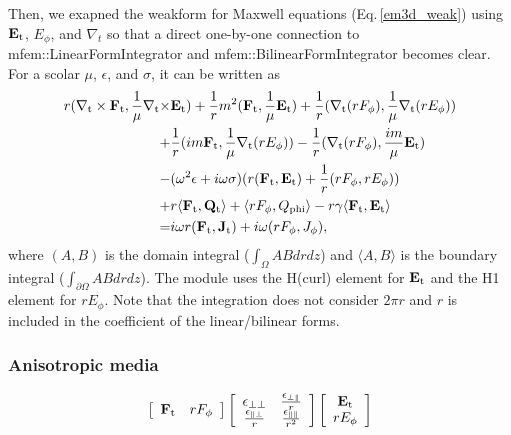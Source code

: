 \documentclass[11pt,a4paper,final]{report}
\begin{document}
Then, we exapned the weakform for Maxwell equations (Eq.\,\ref{em3d_weak}) using $\mathbf{E}_{\rm t}$, $E_{\phi}$, and $\nabla_{t}$ so that a direct one-by-one connection to mfem::LinearFormIntegrator and mfem::BilinearFormIntegrator becomes clear.
For a scolar $\mu$, $\epsilon$, and $\sigma$, it can be written as 
 \begin{align}
r(\nabla_{\rm t} \times \mathbf{F}_{\rm t},  \frac{1}{\mu}\nabla_{\rm t}  \times & \mathbf{E}_{\rm t}) 
+\frac{1}{r} m^2(\mathbf{F}_{\rm t}, \frac{1}{\mu}\mathbf{E}_{\rm t})
+ \frac{1}{r} (\nabla_{\rm t} (rF_{\rm \phi}), \frac{1}{\mu}\nabla_{\rm t} (rE_{\rm \phi}))
 \notag \\
+& \frac{1}{r} (im \mathbf{F}_{\rm t}, \frac{1}{\mu}\nabla_{\rm t} (rE_{\rm \phi}))
- \frac{1}{r} (\nabla_{\rm t} (rF_{\rm \phi}), \frac{im}{\mu} \mathbf{E}_{\rm t})
 \notag \\
 -& (\omega^2 \epsilon+ i \omega \sigma) ( r( \mathbf{F}_{\rm t}, \mathbf{E}_{\rm t}) + \frac{1}{r}(rF_{\rm \phi}, rE_{\rm \phi})) 
 \notag \\
 +& r \langle \mathbf{F}_{\rm t},  \mathbf{Q}_{\rm t} \rangle + \langle rF_{\rm \phi}, Q_{\rm phi} \rangle -r \gamma \langle \mathbf{F}_{\rm t}, \mathbf{E}_{\rm t} \rangle
 \notag \\
 =& i \omega r ( \mathbf{F}_{\rm t}, \mathbf{J}_{\rm t} ) + i \omega ( rF_{\rm \phi}, J_{\rm \phi} ), \label{em2da_weak}
 \end{align}
 where $(A , B)$ is the domain integral ($\int_{\Omega} AB drdz$) and $\langle A, B \rangle $ is the boundary integral ($\int_{\partial \Omega} ABdrdz$). The module uses the H(curl) element for $\mathbf{E}_{\rm t}$ and the H1 element for $rE_{\phi}$. Note that the integration does not consider $2 \pi r$ and $r$ is included in the coefficient of the linear/bilinear forms. 
 
 \subsubsection{Anisotropic media}
 

 \begin{equation}
 \left[ {\begin{array}{*{20}c}
\mathbf{F}_{\rm t}  & rF_{\rm \phi}\\
\end{array}}\right]
\left[ {\begin{array}{*{20}c}
\mathbf{\epsilon}_{\perp \perp}  & \frac{\mathbf{\epsilon}_{\perp \parallel}}{r}\\
\frac{\mathbf{\epsilon}_{\parallel \perp}}{r} & \frac{\mathbf{\epsilon}_{\parallel \parallel}}{r^2}\\
\end{array}}\right]
 \left[ {\begin{array}{*{20}c}
\mathbf{E}_{\rm t}  \\
rE_{\rm \phi}\\
\end{array}}\right]
\label{response_matrix_eq}
\end{equation}
\end{document}

